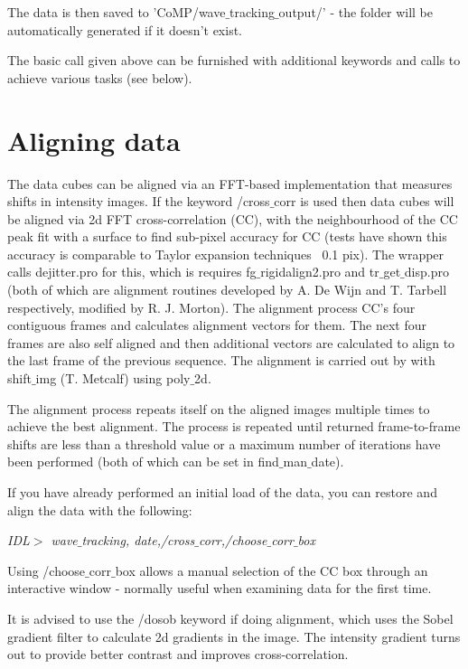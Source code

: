 \documentclass{article}
\begin{document}
\medskip
The data is then saved to 'CoMP/wave$\_$tracking$\_$output/' - the folder will be automatically generated if it doesn't exist.


\medskip
The basic call given above can be furnished with additional keywords and calls to achieve various tasks (see below). 



\section{Aligning data}
The data cubes can be aligned via an FFT-based implementation that measures shifts in intensity images. If the keyword /cross$\_$corr 
is used then data cubes will be aligned via 2d FFT cross-correlation (CC), with the neighbourhood of the CC peak fit with a surface 
to find sub-pixel accuracy for CC (tests have shown this accuracy is comparable to Taylor expansion techniques ~0.1 pix). The 
wrapper calls dejitter.pro for this, which is requires fg$\_$rigidalign2.pro and tr$\_$get$\_$disp.pro (both of which are alignment 
routines developed by A. De Wijn and T. Tarbell respectively, modified by R. J. Morton). The alignment process CC's four contiguous 
frames and calculates alignment vectors for them. The next four frames are also self aligned and then additional vectors are 
calculated to align to the last frame of the previous sequence. The alignment is carried out by with shift$\_$img (T. Metcalf) using 
poly$\_$2d.

\smallskip
The alignment process repeats itself on the aligned images multiple times to achieve the best alignment. The process is repeated
until returned frame-to-frame shifts are less than a threshold value or a maximum number of iterations have been performed (both of 
which can be set in find$\_$man$\_$date).

\medskip
If you have already performed an initial load of the data, you can restore and align the data with the following:

\medskip
\textit{IDL$>$ wave$\_$tracking, date,/cross$\_$corr,/choose$\_$corr$\_$box
}

\medskip
Using /choose$\_$corr$\_$box allows a manual selection of the CC box through an interactive window - normally useful when examining data for the first time. 

\medskip
It is advised to use the /dosob keyword if doing alignment, which uses the Sobel gradient filter to calculate 2d gradients in the image. The intensity gradient turns out to provide better contrast and improves cross-correlation.
\end{document}
